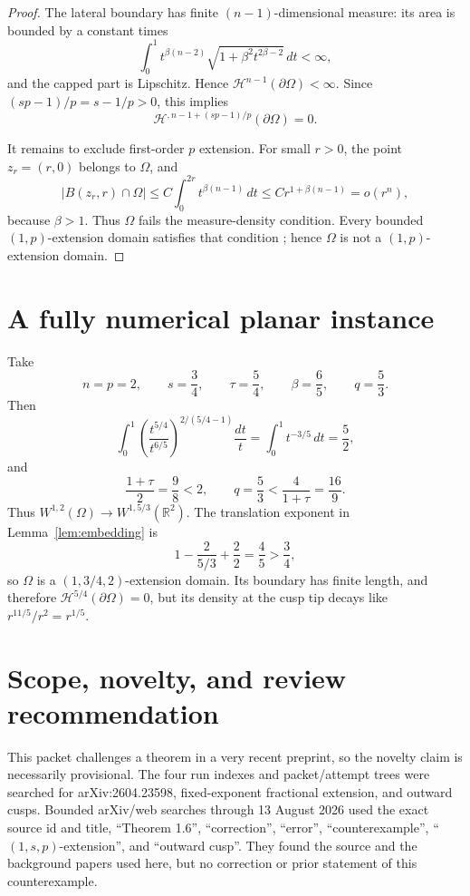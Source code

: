 \documentclass[11pt,a4paper]{article}
\newcommand{\R}{\mathbb R}
\newcommand{\Om}{\Omega}
\newcommand{\Hs}{\mathcal H}
\begin{document}
\begin{proof}
The lateral boundary has finite $(n-1)$-dimensional measure: its area is
bounded by a constant times
\[
 \int_0^1 t^{\beta(n-2)}
 \sqrt{1+\beta^2t^{2\beta-2}}\,dt<\infty,
\]
and the capped part is Lipschitz. Hence
$\Hs^{n-1}(\partial\Om)<\infty$. Since
$(sp-1)/p=s-1/p>0$, this implies
\[
 \Hs^{,n-1+(sp-1)/p}(\partial\Om)=0.
\]

It remains to exclude first-order $p$ extension. For small $r>0$, the point
$z_r=(r,0)$ belongs to $\Om$, and
\[
 |B(z_r,r)\cap\Om|
 \le C\int_0^{2r}t^{\beta(n-1)}\,dt
 \le C r^{1+\beta(n-1)}=o(r^n),
\]
because $\beta>1$. Thus $\Om$ fails the measure-density condition. Every
bounded $(1,p)$-extension domain satisfies that condition
\cite[Theorem~6]{HKT}; hence $\Om$ is not a $(1,p)$-extension domain.
\end{proof}

\section{A fully numerical planar instance}

Take
\[
 n=p=2,\qquad s=\frac34,\qquad
 \tau=\frac54,\qquad \beta=\frac65,\qquad q=\frac53.
\]
Then
\[
 \int_0^1
 \left(\frac{t^{5/4}}{t^{6/5}}\right)^{2/(5/4-1)}\frac{dt}{t}
 =\int_0^1t^{-3/5}\,dt=\frac52,
\]
and
\[
 \frac{1+\tau}{2}=\frac98<2,
 \qquad
 q=\frac53<\frac{4}{1+\tau}=\frac{16}{9}.
\]
Thus $W^{1,2}(\Om)\to W^{1,5/3}(\R^2)$. The translation exponent in
Lemma~\ref{lem:embedding} is
\[
 1-\frac{2}{5/3}+\frac22=\frac45>\frac34,
\]
so $\Om$ is a $(1,3/4,2)$-extension domain. Its boundary has finite length,
and therefore $\Hs^{5/4}(\partial\Om)=0$, but its density at the cusp tip
decays like $r^{11/5}/r^2=r^{1/5}$.

\section{Scope, novelty, and review recommendation}

This packet challenges a theorem in a very recent preprint, so the novelty
claim is necessarily provisional. The four run indexes and packet/attempt
trees were searched for arXiv:2604.23598, fixed-exponent fractional extension,
and outward cusps. Bounded arXiv/web searches through 13 August 2026 used the
exact source id and title, ``Theorem 1.6'', ``correction'', ``error'',
``counterexample'', ``$(1,s,p)$-extension'', and ``outward cusp''. They found
the source and the background papers used here, but no correction or prior
statement of this counterexample.
\end{document}
